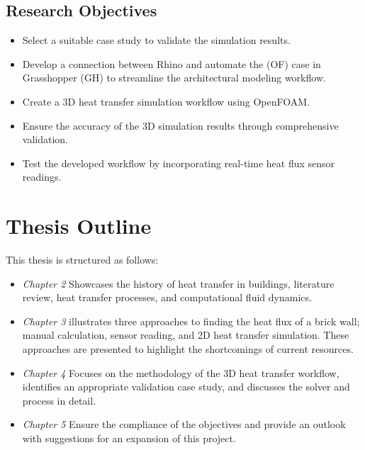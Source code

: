 \subsection{Research Objectives}
\begin{itemize}
    \item Select a suitable case study to validate the simulation results.
    \item Develop a connection between Rhino and automate the (\gls{OF}) case in Grasshopper (\gls{GH}) to streamline the architectural modeling workflow. 
    \item  Create a 3D heat transfer simulation workflow using OpenFOAM.
    \item Ensure the accuracy of the 3D simulation results through comprehensive validation.
    \item Test the developed workflow by incorporating real-time heat flux sensor readings.
 
\end{itemize}







\section{Thesis Outline}
This thesis is structured as follows:
\begin{itemize}
    \item \textit{Chapter 2} Showcases the history of heat transfer in buildings, literature review, heat transfer processes, and computational fluid dynamics.
    \item \textit{Chapter 3} illustrates three approaches to finding the heat flux of a brick wall; manual calculation, sensor reading, and 2D heat transfer simulation. These approaches are presented to highlight the shortcomings of current resources. 
    \item \textit{Chapter 4} Focuses on the methodology of the 3D heat transfer workflow, identifies an appropriate validation case study, and discusses the solver and process in detail.
    \item \textit{Chapter 5} Ensure the compliance of the objectives and provide an outlook with suggestions for an expansion of this project.
\end{itemize}